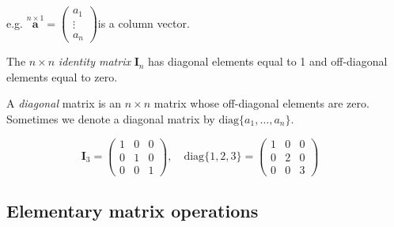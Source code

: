 \documentclass[]{book}
\theoremstyle{definition}
\theoremstyle{definition}
\theoremstyle{definition}
\theoremstyle{remark}
\begin{document}
e.g. \(\stackrel{n\times 1}{\mathbf a}=\left( \begin{array}{c} a_1\\\vdots\\a_n \end{array} \right)\)\quad is a column vector.

The \(n\times n\) \emph{identity matrix} \({\mathbf I}_n\) has diagonal elements equal to 1
and off-diagonal elements equal to zero.

A \emph{diagonal} matrix is an \(n \times n\) matrix whose
off-diagonal elements are zero. Sometimes we denote a diagonal
matrix by \(\text{diag}\{a_1,\ldots, a_n\}\).

\[\mathbf I_3 = \left(\begin{array}{ccc} 1&0&0\\ 0&1&0\\ 0&0&1\end{array}\right),\quad \text{diag}\{1,2,3\}=\left(\begin{array}{ccc} 1&0&0\\ 0&2&0\\ 0&0&3\end{array}\right)\quad\]

\hypertarget{elementary-matrix-operations}{%
\subsection{Elementary matrix operations}\label{elementary-matrix-operations}}
\end{document}
